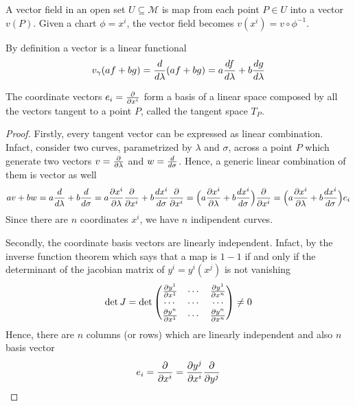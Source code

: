    A vector field in an open set $U \subseteq \mathcal M$ is map from each point $P \in U$ into a vector $v(P)$. Given a chart $\phi = x^i$, the vector field becomes $v (x^i) = v \circ \phi^{-1}$.

    By definition a vector is a linear functional
    \begin{equation*}
        v_\gamma (af + bg) = \frac{d}{d\lambda} (af+bg) = a \frac{df}{d\lambda} + b \frac{dg}{d\lambda}
    \end{equation*}

    The coordinate vectors $e_i = \frac{\partial}{\partial x^i}$ form a basis of a linear space composed by all the vectors tangent to a point $P$, called the tangent space $T_P$.

    \begin{proof}
    Firstly, every tangent vector can be expressed as linear combination. Infact, consider two curves, parametrized by $\lambda$ and $\sigma$, across a point $P$ which generate two vectors $v = \frac{\partial}{\partial\lambda}$ and $w = \frac{d}{d\sigma}$. Hence, a generic linear combination of them is vector as well
    \begin{equation*}
        a v + b w = a \frac{d}{d\lambda} + b \frac{d}{d\sigma} = a \frac{\partial x^i}{\partial\lambda} \frac{\partial}{\partial x^i} + b \frac{dx^i}{d\sigma} \frac{\partial}{\partial x^i} = \Big ( a \frac{\partial x^i}{\partial\lambda} + b \frac{dx^i}{d\sigma} \Big ) \frac{\partial}{\partial x^i} = \Big ( a \frac{\partial x^i}{\partial\lambda} + b \frac{dx^i}{d\sigma} \Big ) e_i
    \end{equation*}
    Since there are $n$ coordinates $x^i$, we have $n$ indipendent curves.

    Secondly, the coordinate basis vectors are linearly independent. 
    Infact, by the inverse function theorem which says that a map is $1-1$ if and only if the determinant of the jacobian matrix of $y^i = y^i(x^j)$ is not vanishing
    \begin{equation*}
        \det J = \det 
        \begin{pmatrix}
            \frac{\partial y^1}{\partial x^1} & \cdots & \frac{\partial y^1}{\partial x^n} \\
            \cdots & \cdots & \cdots \\
            \frac{\partial y^n}{\partial x^1} & \cdots & \frac{\partial y^n}{\partial x^n} \\
        \end{pmatrix} \neq 0
    \end{equation*}
    Hence, there are $n$ columns (or rows) which are linearly independent and also $n$ basis vector
    \begin{equation*}
        e_i = \frac{\partial}{\partial x^i} = \frac{\partial y^j}{\partial x^i} \frac{\partial}{\partial y^j}
    \end{equation*}

    \end{proof}

